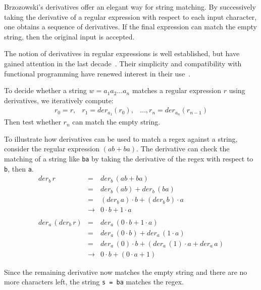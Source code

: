 \documentclass[12pt]{article}
\begin{document}
Brzozowski’s derivatives offer an elegant way for string matching. By successively taking the derivative of a regular
expression with respect to each input character, one obtains a sequence of derivatives. If the final expression can match 
the empty string, then the original input is accepted.

The notion of derivatives in regular expressions is well established, but have gained attention in the last 
decade~\cite{Owens2009, Might2011}. Their simplicity and compatibility with functional programming have renewed interest in
their use~\cite{Fischer2010}.

To decide whether a string $w = a_1 a_2 \dots a_n$ matches a regular expression $r$ using derivatives, we iteratively compute:
\[
\begin{array}{rcl}
r_0 = r,& r_1 = der_{a_1}({r_0}),& \dots, {r_n}=der_{a_n}(r_{n-1})
\end{array}
\]
Then test whether $r_n$ can match the empty string.

To illustrate how derivatives can be used to match a regex against a string, consider the regular expression $( ab + ba )$. 
The derivative can check the matching of a string like \texttt{ba} by taking the derivative of the regex with respect to \texttt{b},
then \texttt{a}.
\[
\begin{array}{rcl}
der_b\, r           & =           &  der_b\, (ab + ba) \\
                    & =           & der_b\, (ab) + der_b\, (ba) \\
                    & =           & (der_b\, a) \cdot b + (der_b\, b) \cdot a  \\
                    & \rightarrow & 0 \cdot b + 1 \cdot a \\\\

der_a\, (der_b\, r) & =           & der_a\, (0 \cdot b + 1 \cdot a)\\
                    & =           & der_a\, (0 \cdot b) + der_a\, (1 \cdot a)\\
                    & =           & der_a\,(0) \cdot b + (der_a\, (1) \cdot a + der_a\, a)\\
                    & \rightarrow & 0 \cdot b + (0 \cdot a + 1 )
\end{array}
\]

Since the remaining derivative now matches the empty string and there are no more characters left, 
the string \texttt{s = ba} matches the regex.
\end{document}
